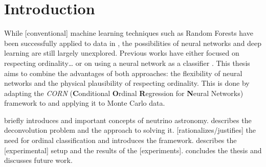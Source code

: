 \chapter{Introduction}
While [conventional] machine learning techniques
  such as Random Forests
have been successfully applied to \icecube{} data in \dsea{},
the possibilities of neural networks and deep learning are still largely unexplored. %
%
Previous works have either
  focused on respecting ordinality… \cite{dsea_jan}
  or on using a neural network as a classifier \cite{dsea_samuel}.
This thesis aims to combine the advantages of both approaches:
  the flexibility of neural networks
  and the physical plausibility of respecting ordinality.
This is done by adapting the
\emph{CORN} (\textbf{C}onditional \textbf{O}rdinal \textbf{R}egression for \textbf{N}eural Networks) \cite{corn} framework
to \dsea{}
and applying it to \icecube{} Monte Carlo data.

 briefly introduces \icecube{} and important concepts of neutrino astronomy.
 describes the deconvolution problem and the \dsea{} approach to solving it.
 [rationalizes/justifies] the need for ordinal classification and introduces the \corn{} framework.
 describes the [experimental] setup and the results of the [experiments].
 concludes the thesis and discusses future work.

\blindtext[2]
